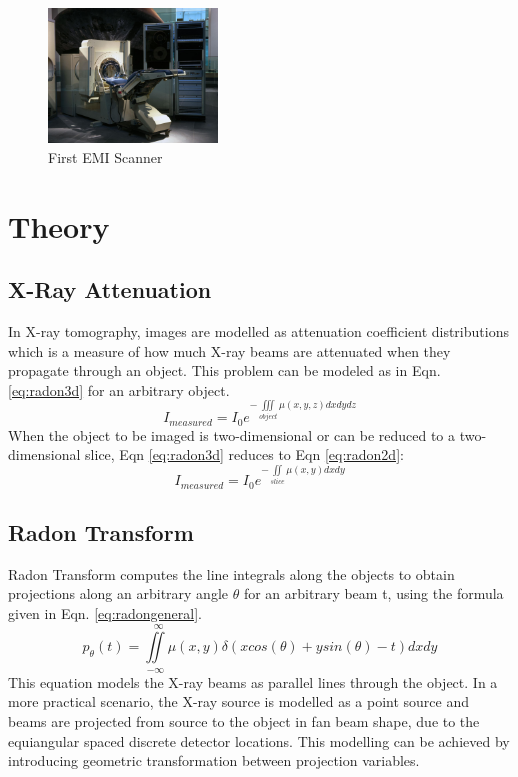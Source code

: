 \documentclass[journal]{IEEEtran}
\begin{document}
\begin{figure}[h]
\centering
\includegraphics[width=0.4\textwidth, height=0.2\textwidth]{images/CT.jpg}
\caption{First EMI Scanner \cite{emict}}\label{fig:CT1010}
\end{figure}

\vfill{\null}

\section{Theory} \label{sec:theory}
\subsection{X-Ray Attenuation}
In X-ray tomography, images are modelled as attenuation coefficient distributions which is a measure of how much X-ray beams are attenuated when they propagate through an object. This problem can be modeled as in Eqn. \ref{eq:radon3d} for an arbitrary object.
\begin{equation} 
	I_{measured} = I_0 e^{-\iiint\limits_{object}\mu(x,y,z)dxdydz}
	\label{eq:radon3d}
\end{equation}
When the object to be imaged is two-dimensional or can be reduced to a two-dimensional slice, Eqn \ref{eq:radon3d} reduces to Eqn \ref{eq:radon2d}:
\begin{equation}
	I_{measured} = I_0 e^{-\iint\limits_{slice}\mu(x,y)dxdy}
	\label{eq:radon2d}
\end{equation}
\subsection{Radon Transform}
Radon Transform computes the line integrals along the objects to obtain projections along an arbitrary angle $\theta$ for an arbitrary beam t, using the formula given in Eqn. \ref{eq:radongeneral}.
\begin{equation}
	p_{\theta}(t) = \iint\limits_{-\infty}^{\ \ \ \infty}\mu(x,y)\delta(xcos(\theta)+ysin(\theta)-t)dxdy
	\label{eq:radongeneral}
\end{equation}
This equation models the X-ray beams as parallel lines through the object. In a more practical scenario, the X-ray source is modelled as a point source and beams are projected from source to the object in fan beam shape, due to the equiangular spaced discrete detector locations. This modelling can be achieved by introducing geometric transformation between projection variables. 
\end{document}
